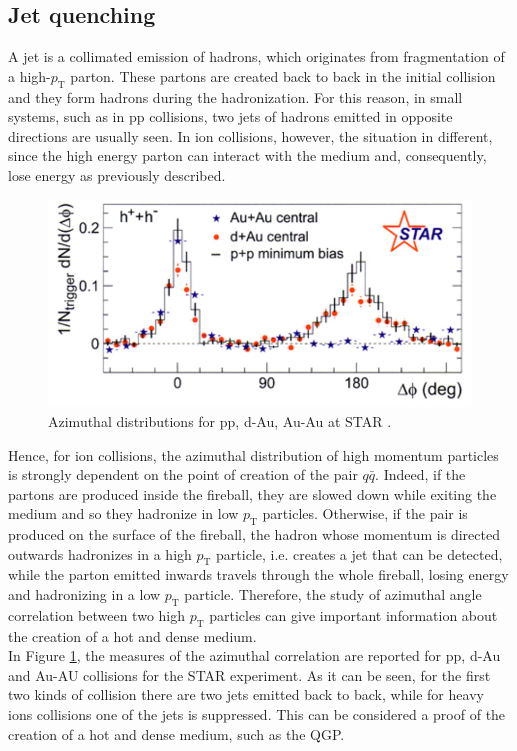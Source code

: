 \subsection{Jet quenching}
A jet is a collimated emission of hadrons, which originates from fragmentation of a high-$p_{\mathrm{T}}$ parton. These partons are created back to back in the initial collision and they form hadrons during the hadronization. For this reason, in small systems, such as in pp collisions, two jets of hadrons emitted in opposite directions are usually seen. In ion collisions, however, the situation in different, since the high energy parton can interact with the medium and, consequently, lose energy as previously described.
%
\begin{figure}
  \centering
  \includegraphics[scale=0.3]{figures/zoom.jpeg}
  \caption{Azimuthal distributions for pp, d-Au, Au-Au at STAR \cite{jets}.}
  \label{fig:jet}
\end{figure}
%
Hence, for ion collisions, the azimuthal distribution of high momentum particles is strongly dependent on the point of creation of the pair $q\bar{q}$. Indeed, if the partons are produced inside the fireball, they are slowed down while exiting the medium and so they hadronize in low $p_{\mathrm{T}}$ particles. Otherwise, if the pair is produced on the surface of the fireball, the hadron whose momentum is directed outwards hadronizes in a high $p_{\mathrm{T}}$ particle, i.e. creates a jet that can be detected, while the parton emitted inwards travels through the whole fireball, losing energy and hadronizing in a low $p_{\mathrm{T}}$ particle. Therefore, the study of azimuthal angle correlation between two high $p_{\mathrm{T}}$ particles can give important information about the creation of a hot and dense medium.\\
In Figure \ref{fig:jet}, the measures of the azimuthal correlation are reported for pp, d-Au and Au-AU collisions for the STAR experiment. As it can be seen, for the first two kinds of collision there are two jets emitted back to back, while for heavy ions collisions one of the jets is suppressed. This can be considered a proof of the creation of a hot and dense medium, such as the QGP.
%
